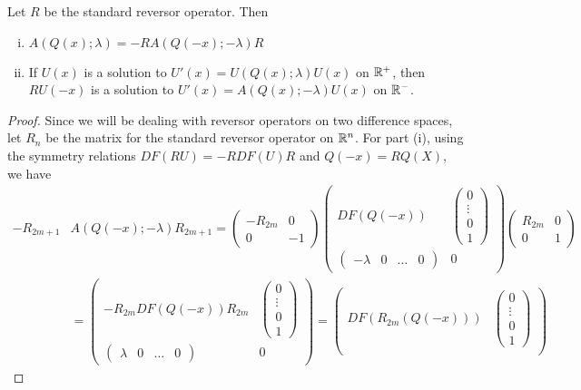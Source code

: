\documentclass[thesis.tex]{subfiles}
\begin{document}
\begin{lemma}\label{AQxsymmetrylemma}
Let $R$ be the standard reversor operator. Then
\begin{enumerate}[(i)]
\item $A(Q(x); \lambda) = -R A(Q(-x); -\lambda)R$
\item If $U(x)$ is a solution to $U'(x) = U(Q(x); \lambda) U(x)$ on $\mathbb{R}^+$, then $R U(-x)$ is a solution to $U'(x) = A(Q(x); -\lambda) U(x)$ on $\mathbb{R}^-$.
\end{enumerate}
\begin{proof}
Since we will be dealing with reversor operators on two difference spaces, let $R_{n}$ be the matrix for the standard reversor operator on $\mathbb{R}^n$. For part (i), using the symmetry relations $DF(RU) = -RDF(U)R$ and $Q(-x) = RQ(X)$, we have
\begin{align*}
-R_{2m+1} &A(Q(-x); -\lambda) R_{2m+1}
= \begin{pmatrix}-R_{2m} & 0 \\ 0 & -1 \end{pmatrix} 
\begin{pmatrix}
DF(Q(-x)) & \begin{pmatrix} 0 \\ \vdots \\ 0 \\ 1 \end{pmatrix} \\
\begin{pmatrix} -\lambda & 0 & \dots & 0 \end{pmatrix} & 0
\end{pmatrix} \begin{pmatrix}R_{2m} & 0 \\ 0 & 1 \end{pmatrix} \\
&= \begin{pmatrix}
-R_{2m} DF(Q(-x)) R_{2m} & \begin{pmatrix} 0 \\ \vdots \\ 0 \\ 1 \end{pmatrix} \\
\begin{pmatrix} \lambda & 0 & \dots & 0 \end{pmatrix} & 0
\end{pmatrix} 
= \begin{pmatrix}
DF(R_{2m}(Q(-x))) & \begin{pmatrix} 0 \\ \vdots \\ 0 \\ 1 \end{pmatrix} \\

\end{pmatrix}
\end{align*}
\end{proof}
\end{lemma}
\end{document}
